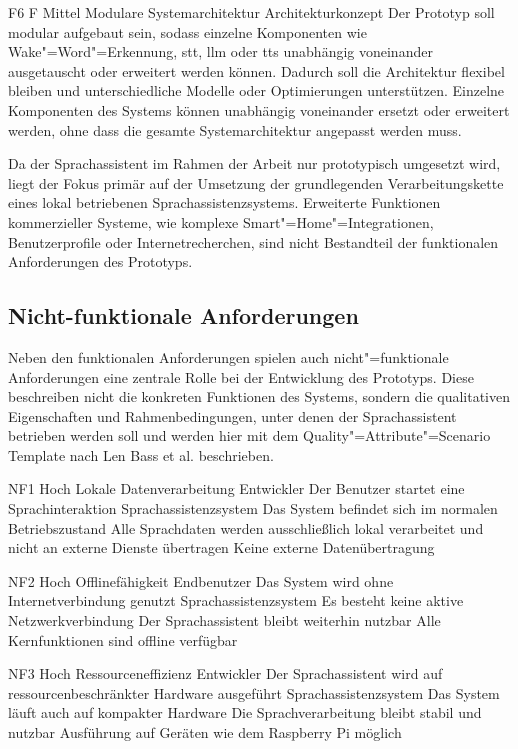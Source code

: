 \snowcard
{F6}
{F}
{Mittel}
{Modulare Systemarchitektur}
{Architekturkonzept}
{}
{Der Prototyp soll modular aufgebaut sein, sodass einzelne Komponenten wie Wake"=Word"=Erkennung, \gls{stt}, \gls{llm} oder \gls{tts} unabhängig voneinander ausgetauscht oder erweitert werden können. Dadurch soll die Architektur flexibel bleiben und unterschiedliche Modelle oder Optimierungen unterstützen.}
{Einzelne Komponenten des Systems können unabhängig voneinander ersetzt oder erweitert werden, ohne dass die gesamte Systemarchitektur angepasst werden muss.}
{}

Da der Sprachassistent im Rahmen der Arbeit nur prototypisch umgesetzt wird, liegt der Fokus primär auf der Umsetzung der grundlegenden Verarbeitungskette eines lokal betriebenen Sprachassistenzsystems. Erweiterte Funktionen kommerzieller Systeme, wie komplexe Smart"=Home"=Integrationen, Benutzerprofile oder Internetrecherchen, sind nicht Bestandteil der funktionalen Anforderungen des Prototyps.


\subsection{Nicht-funktionale Anforderungen}
\label{subsec:Nicht-funktionale_Anforderungen}
Neben den funktionalen Anforderungen spielen auch nicht"=funktionale Anforderungen eine zentrale Rolle bei der Entwicklung des Prototyps. Diese beschreiben nicht die konkreten Funktionen des Systems, sondern die qualitativen Eigenschaften und Rahmenbedingungen, unter denen der Sprachassistent betrieben werden soll und werden hier mit dem Quality"=Attribute"=Scenario Template \autocite{softwareArchitecturePractice} nach Len Bass et al. beschrieben.

\qas
{NF1}
{Hoch}
{Lokale Datenverarbeitung}
{Entwickler}
{Der Benutzer startet eine Sprachinteraktion}
{Sprachassistenzsystem}
{Das System befindet sich im normalen Betriebszustand}
{Alle Sprachdaten werden ausschließlich lokal verarbeitet und nicht an externe Dienste übertragen}
{Keine externe Datenübertragung}

\qas
{NF2}
{Hoch}
{Offlinefähigkeit}
{Endbenutzer}
{Das System wird ohne Internetverbindung genutzt}
{Sprachassistenzsystem}
{Es besteht keine aktive Netzwerkverbindung}
{Der Sprachassistent bleibt weiterhin nutzbar}
{Alle Kernfunktionen sind offline verfügbar}

\qas
{NF3}
{Hoch}
{Ressourceneffizienz}
{Entwickler}
{Der Sprachassistent wird auf ressourcenbeschränkter Hardware ausgeführt}
{Sprachassistenzsystem}
{Das System läuft auch auf kompakter Hardware}
{Die Sprachverarbeitung bleibt stabil und nutzbar}
{Ausführung auf Geräten wie dem Raspberry Pi möglich}

